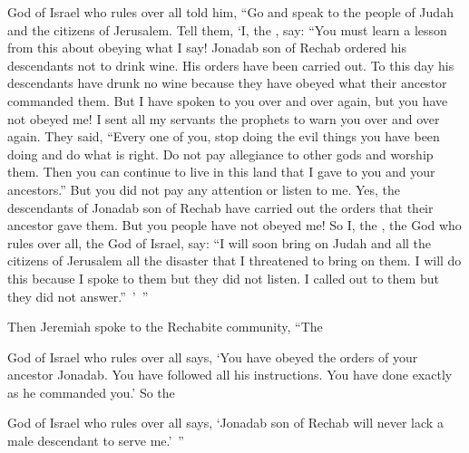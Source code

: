 {{}
God
of Israel
who rules over all
told
him, “Go
and speak to
the people
of Judah
and the citizens
of Jerusalem.
Tell them, ‘I, the
{}, say: “You must
learn
a lesson
from this about
obeying what
I say!
Jonadab
son
of Rechab
ordered
his descendants
not
to drink
wine.
His orders have been carried out. To this
day
his descendants
have drunk
no
wine because
they have obeyed what
their ancestor
commanded them. But I
have spoken
to
you over and over again,
but
you have not
obeyed
me!
I sent
all
my servants
the prophets
to warn you over and over again.
They said,
“Every one
of you, stop
doing
the evil
things you
have been doing
and do what is right. Do not
pay allegiance
to other
gods
and worship
them. Then you can continue to live
in this
land
that
I gave
to you and your ancestors.”
But you did not
pay
any attention
or
listen
to me.
Yes,
the descendants
of Jonadab
son
of Rechab
have carried out the orders
that
their ancestor
gave them.
But you people
have
not
obeyed
me!
So
I,
the {},
the God
who rules over all,
the God
of Israel,
say: “I will soon
bring
on Judah
and all
the citizens
of Jerusalem
all
the disaster
that
I threatened
to bring on
them. I will do this because
I spoke
to them
but they did not
listen.
I called
out to them but they did not
answer.” ’ ”
\par }{\PP {}Then Jeremiah
spoke to the Rechabite
community, “The

{}
God
of Israel
who rules over all
says, ‘You have obeyed
the orders
of your ancestor
Jonadab.
You have followed
all
his
instructions.
You have done
exactly
as he commanded you.’
So
the

{}
God
of Israel
who rules over all
says, ‘Jonadab
son
of Rechab
will never
lack
a male
descendant to serve me.’ ”

}
